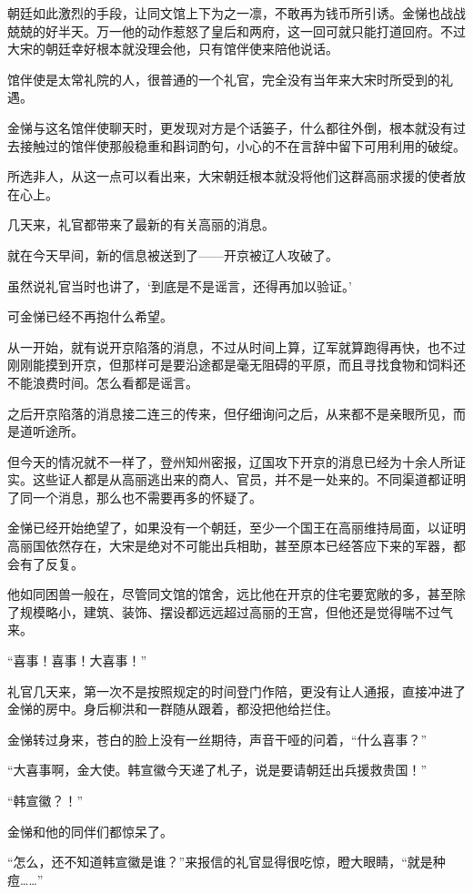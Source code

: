 朝廷如此激烈的手段，让同文馆上下为之一凛，不敢再为钱币所引诱。金悌也战战兢兢的好半天。万一他的动作惹怒了皇后和两府，这一回可就只能打道回府。不过大宋的朝廷幸好根本就没理会他，只有馆伴使来陪他说话。

馆伴使是太常礼院的人，很普通的一个礼官，完全没有当年来大宋时所受到的礼遇。

金悌与这名馆伴使聊天时，更发现对方是个话篓子，什么都往外倒，根本就没有过去接触过的馆伴使那般稳重和斟词酌句，小心的不在言辞中留下可用利用的破绽。

所选非人，从这一点可以看出来，大宋朝廷根本就没将他们这群高丽求援的使者放在心上。

几天来，礼官都带来了最新的有关高丽的消息。

就在今天早间，新的信息被送到了——开京被辽人攻破了。

虽然说礼官当时也讲了，‘到底是不是谣言，还得再加以验证。’

可金悌已经不再抱什么希望。

从一开始，就有说开京陷落的消息，不过从时间上算，辽军就算跑得再快，也不过刚刚能摸到开京，但那样可是要沿途都是毫无阻碍的平原，而且寻找食物和饲料还不能浪费时间。怎么看都是谣言。

之后开京陷落的消息接二连三的传来，但仔细询问之后，从来都不是亲眼所见，而是道听途所。

但今天的情况就不一样了，登州知州密报，辽国攻下开京的消息已经为十余人所证实。这些证人都是从高丽逃出来的商人、官员，并不是一处来的。不同渠道都证明了同一个消息，那么也不需要再多的怀疑了。

金悌已经开始绝望了，如果没有一个朝廷，至少一个国王在高丽维持局面，以证明高丽国依然存在，大宋是绝对不可能出兵相助，甚至原本已经答应下来的军器，都会有了反复。

他如同困兽一般在，尽管同文馆的馆舍，远比他在开京的住宅要宽敞的多，甚至除了规模略小，建筑、装饰、摆设都远远超过高丽的王宫，但他还是觉得喘不过气来。

“喜事！喜事！大喜事！”

礼官几天来，第一次不是按照规定的时间登门作陪，更没有让人通报，直接冲进了金悌的房中。身后柳洪和一群随从跟着，都没把他给拦住。

金悌转过身来，苍白的脸上没有一丝期待，声音干哑的问着，“什么喜事？”

“大喜事啊，金大使。韩宣徽今天递了札子，说是要请朝廷出兵援救贵国！”

“韩宣徽？！”

金悌和他的同伴们都惊呆了。

“怎么，还不知道韩宣徽是谁？”来报信的礼官显得很吃惊，瞪大眼睛，“就是种痘……”

